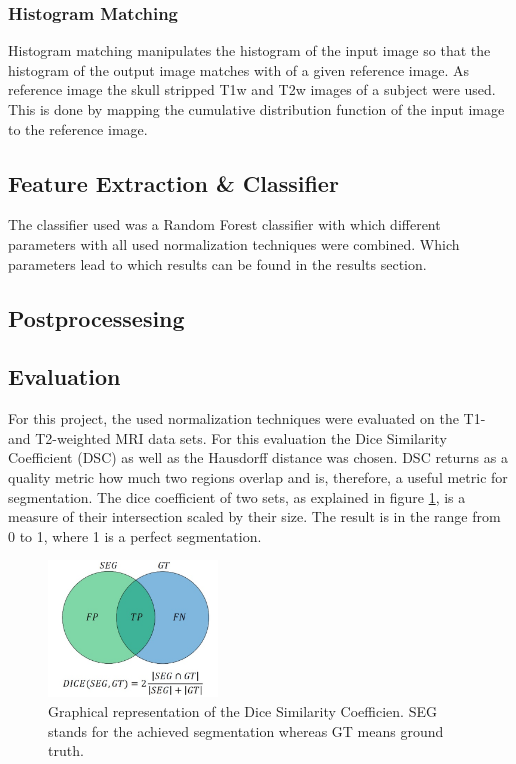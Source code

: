 \documentclass[journal]{IEEEtran}
\begin{document}
		\subsubsection{Histogram Matching}
		Histogram matching manipulates the histogram of the input image so that the histogram of the output image matches with of a given reference image. As reference image the skull stripped T1w and T2w images of a subject were used. 
		This is done by mapping the cumulative distribution function of the input image to the reference image. 
		
		

\subsection{ Feature Extraction \& Classifier}
	The classifier used was a Random Forest classifier with which different parameters with all used normalization techniques were combined. Which parameters
	lead to which results can be found in the results section.

\subsection{Postprocessesing}

\subsection{Evaluation}
	For this project, the used normalization techniques were evaluated on the T1- and T2-weighted MRI data sets. 
	For this evaluation the Dice Similarity Coefficient (DSC) as well as the Hausdorff distance was chosen.
	DSC returns as a quality metric how much two regions overlap and is, therefore, a useful metric for segmentation.
	The dice coefficient of two sets, as explained in figure \ref{fig:e2}, is a measure of their intersection scaled by their size. The result is in the range from 0 to 1, where 1 is a perfect segmentation. 
	
	\begin{figure}[h]
		\centering
		\includegraphics[width=0.4\textwidth]{diceGraphics}
		\caption{Graphical representation of the Dice Similarity Coefficien. SEG stands for the achieved segmentation whereas GT means ground truth.}
		\label{fig:e2}
	\end{figure}
\end{document}
